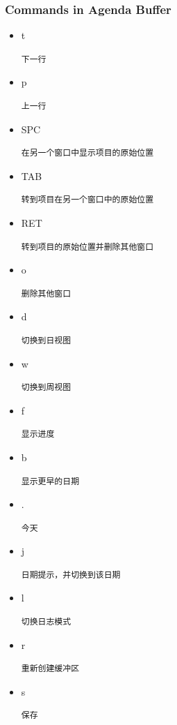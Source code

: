 \documentclass[11pt]{article}
\begin{document}
\subsubsection{Commands in Agenda Buffer}
\label{sec:org99157e1}
\begin{itemize}
\item t
\begin{verbatim}
下一行
\end{verbatim}
\item p
\begin{verbatim}
上一行
\end{verbatim}
\item SPC
\begin{verbatim}
在另一个窗口中显示项目的原始位置
\end{verbatim}
\item TAB
\begin{verbatim}
转到项目在另一个窗口中的原始位置
\end{verbatim}
\item RET
\begin{verbatim}
转到项目的原始位置并删除其他窗口
\end{verbatim}
\item o
\begin{verbatim}
删除其他窗口
\end{verbatim}
\item d
\begin{verbatim}
切换到日视图
\end{verbatim}
\item w
\begin{verbatim}
切换到周视图
\end{verbatim}
\item f
\begin{verbatim}
显示进度
\end{verbatim}
\item b
\begin{verbatim}
显示更早的日期
\end{verbatim}
\item .
\begin{verbatim}
今天
\end{verbatim}
\item j
\begin{verbatim}
日期提示，并切换到该日期
\end{verbatim}
\item l
\begin{verbatim}
切换日志模式
\end{verbatim}
\item r
\begin{verbatim}
重新创建缓冲区
\end{verbatim}
\item s
\begin{verbatim}
保存
\end{verbatim}
\end{itemize}
\end{document}
